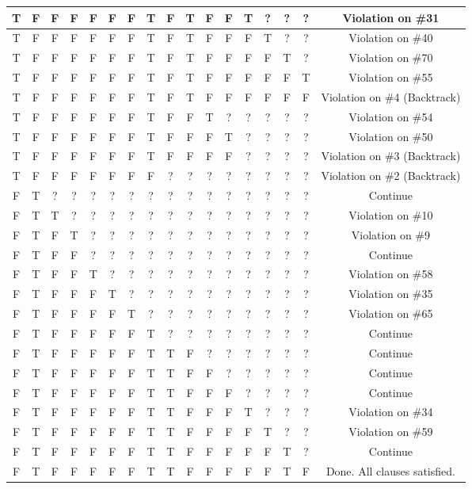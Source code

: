 \documentclass[22pt]{article}
\begin{document}
\begin{table}[htbp]
\begin{tabular}{ |c|c|c|c|c|c|c|c|c|c|c|c|c|c|c|c|c| }
 T & F & F & F & F & F & F & T & F & T & F & F & T & ? & ? & ? & Violation on \#31 \\ \hline
 T & F & F & F & F & F & F & T & F & T & F & F & F & T & ? & ? & Violation on \#40 \\ \hline
 T & F & F & F & F & F & F & T & F & T & F & F & F & F & T & ? & Violation on \#70 \\ \hline
 T & F & F & F & F & F & F & T & F & T & F & F & F & F & F & T & Violation on \#55 \\ \hline
 T & F & F & F & F & F & F & T & F & T & F & F & F & F & F & F & Violation on \#4 (Backtrack) \\ \hline
 T & F & F & F & F & F & F & T & F & F & T & ? & ? & ? & ? & ? & Violation on \#54 \\ \hline
 T & F & F & F & F & F & F & T & F & F & F & T & ? & ? & ? & ? & Violation on \#50 \\ \hline
 T & F & F & F & F & F & F & T & F & F & F & F & ? & ? & ? & ? & Violation on \#3 (Backtrack) \\ \hline
 T & F & F & F & F & F & F & F & ? & ? & ? & ? & ? & ? & ? & ? & Violation on \#2 (Backtrack) \\ \hline
 F & T & ? & ? & ? & ? & ? & ? & ? & ? & ? & ? & ? & ? & ? & ? & Continue \\ \hline
 F & T & T & ? & ? & ? & ? & ? & ? & ? & ? & ? & ? & ? & ? & ? & Violation on \#10 \\ \hline
 F & T & F & T & ? & ? & ? & ? & ? & ? & ? & ? & ? & ? & ? & ? & Violation on \#9 \\ \hline
 F & T & F & F & ? & ? & ? & ? & ? & ? & ? & ? & ? & ? & ? & ? & Continue \\ \hline
 F & T & F & F & T & ? & ? & ? & ? & ? & ? & ? & ? & ? & ? & ? & Violation on \#58 \\ \hline
 F & T & F & F & F & T & ? & ? & ? & ? & ? & ? & ? & ? & ? & ? & Violation on \#35 \\ \hline
 F & T & F & F & F & F & T & ? & ? & ? & ? & ? & ? & ? & ? & ? & Violation on \#65 \\ \hline
 F & T & F & F & F & F & F & T & ? & ? & ? & ? & ? & ? & ? & ? & Continue \\ \hline
 F & T & F & F & F & F & F & T & T & F & ? & ? & ? & ? & ? & ? & Continue \\ \hline
 F & T & F & F & F & F & F & T & T & F & F & ? & ? & ? & ? & ? & Continue \\ \hline
 F & T & F & F & F & F & F & T & T & F & F & F & ? & ? & ? & ? & Continue \\ \hline
 F & T & F & F & F & F & F & T & T & F & F & F & T & ? & ? & ? & Violation on \#34 \\ \hline
 F & T & F & F & F & F & F & T & T & F & F & F & F & T & ? & ? & Violation on \#59 \\ \hline
 F & T & F & F & F & F & F & T & T & F & F & F & F & F & T & ? & Continue \\ \hline
 F & T & F & F & F & F & F & T & T & F & F & F & F & F & T & F & Done. All clauses satisfied. \\ \hline
 \end{tabular}
 \end{table}
\end{document}
